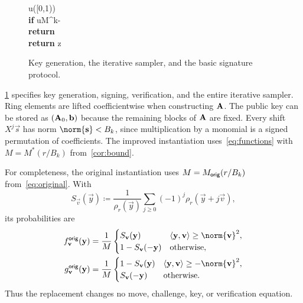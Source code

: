 \begin{figure}[!htbp]
\begin{minipage}[t]{.49\linewidth}
{ u\leftarrow\Unif([0,1)) \\
 \textbf{if }u\ge M^{k-\kappa} \\
 \quad\textbf{return }\bot \\
 \textbf{return }\vec z
}
\medskip
{}
\end{minipage}
\caption{Key generation, the iterative sampler, and the basic signature protocol.}
\label{fig:signature}
\end{figure}

\cref{fig:signature} specifies key generation, signing, verification, and the entire iterative sampler. Ring elements are lifted coefficientwise when constructing $\mathbf{A}$. The public key can be stored as $(\mathbf{A}_0,\mathbf{b})$ because the remaining blocks of $\mathbf{A}$ are fixed. Every shift $X^j\vec s$ has norm $\norm{\vec s}<B_k$, since multiplication by a monomial is a signed permutation of coefficients. The improved instantiation uses~\cref{eq:functions} with $M=M^*(r/B_k)$ from~\cref{cor:bound}.

For completeness, the original instantiation uses $M=M_{\mathsf{orig}}(r/B_k)$ from~\cref{eq:original}. With
\[
 S_{\vec v}(\vec y)\coloneqq\frac{1}{\rho_r(\vec y)}\sum_{j\ge0}(-1)^j\rho_r(\vec y+j\vec v),
\]
its probabilities are~\cite[Corollary~1]{GartnerFull}
\begin{align*}
 f^{\mathsf{orig}}_{\vec v}(\vec y)&=\frac1M
 \begin{cases}S_{\vec v}(\vec y)&\inner{\vec y}{\vec v}\ge\norm{\vec v}^2,\\1-S_{\vec v}(-\vec y)&\text{otherwise},\end{cases}
 \\
 g^{\mathsf{orig}}_{\vec v}(\vec y)&=\frac1M
 \begin{cases}1-S_{\vec v}(\vec y)&\inner{\vec y}{\vec v}\ge-\norm{\vec v}^2,\\S_{\vec v}(-\vec y)&\text{otherwise}.\end{cases}
\end{align*}
Thus the replacement changes no move, challenge, key, or verification equation.

